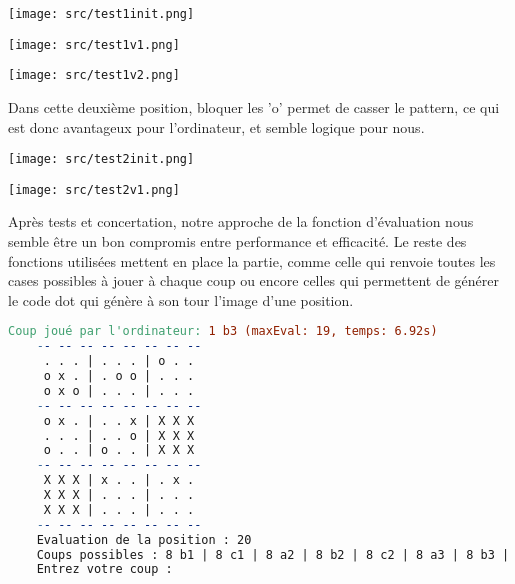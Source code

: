 \documentclass[14pt,a4paper]{article}
\begin{document}
\begin{minipage}{0.3\textwidth}
    \begin{center}
        \texttt{[image: src/test1init.png]}
    \end{center}
\end{minipage}
\hfill
\begin{minipage}{0.3\textwidth}
    \begin{center}
        \texttt{[image: src/test1v1.png]}
    \end{center}
\end{minipage}
\hfill
\begin{minipage}{0.3\textwidth}
    \begin{center}
        \texttt{[image: src/test1v2.png]}
    \end{center}
\end{minipage}

Dans cette deuxième position, bloquer les 'o' permet de casser le pattern, ce qui est donc avantageux pour l'ordinateur, et semble logique pour nous.

\begin{minipage}{0.5\textwidth}
    \begin{center}
        \texttt{[image: src/test2init.png]}
    \end{center}
\end{minipage}
\hfill
\begin{minipage}{0.5\textwidth}
    \begin{center}
        \texttt{[image: src/test2v1.png]}
    \end{center}
\end{minipage}

Après tests et concertation, notre approche de la fonction d'évaluation nous semble être un bon compromis entre performance et efficacité. Le reste des fonctions utilisées mettent en place la partie, comme celle qui renvoie toutes les cases possibles à jouer à chaque coup ou encore celles qui permettent de générer le code dot qui génère à son tour l'image d'une position.\\

\begin{lstlisting}[language=make]
    Coup joué par l'ordinateur: 1 b3 (maxEval: 19, temps: 6.92s)
    -- -- -- -- -- -- -- --
     . . . | . . . | o . . 
     o x . | . o o | . . . 
     o x o | . . . | . . . 
    -- -- -- -- -- -- -- --
     o x . | . . x | X X X 
     . . . | . . o | X X X 
     o . . | o . . | X X X 
    -- -- -- -- -- -- -- --
     X X X | x . . | . x . 
     X X X | . . . | . . . 
     X X X | . . . | . . . 
    -- -- -- -- -- -- -- --
    Evaluation de la position : 20
    Coups possibles : 8 b1 | 8 c1 | 8 a2 | 8 b2 | 8 c2 | 8 a3 | 8 b3 | 8 c3 | 
    Entrez votre coup :
\end{lstlisting}
\end{document}
